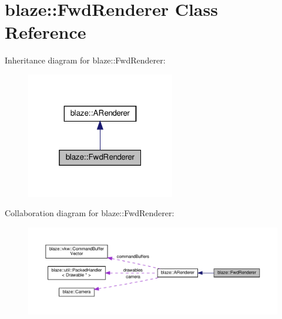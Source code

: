 \hypertarget{classblaze_1_1FwdRenderer}{}\section{blaze\+:\+:Fwd\+Renderer Class Reference}
\label{classblaze_1_1FwdRenderer}


Inheritance diagram for blaze\+:\+:Fwd\+Renderer\+:\nopagebreak
\begin{figure}[H]
\begin{center}
\leavevmode
\includegraphics[width=184pt]{classblaze_1_1FwdRenderer__inherit__graph}
\end{center}
\end{figure}


Collaboration diagram for blaze\+:\+:Fwd\+Renderer\+:\nopagebreak
\begin{figure}[H]
\begin{center}
\leavevmode
\includegraphics[width=350pt]{classblaze_1_1FwdRenderer__coll__graph}
\end{center}
\end{figure}
